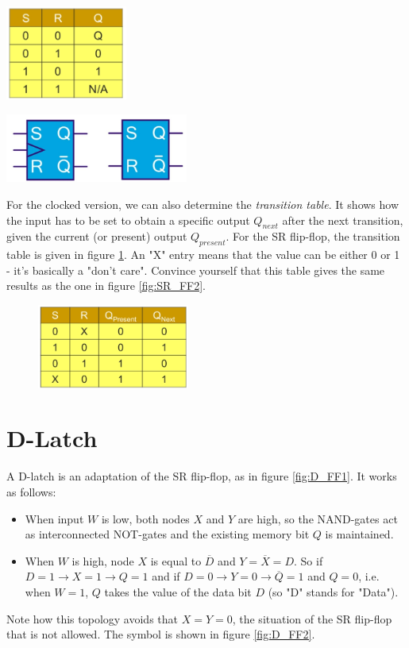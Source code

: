 \begin{minipage}{.5\textwidth}
	\centering
	\includegraphics[width=4cm]{figures/ch17/SR_FF2.jpg}
	\label{fig:SR_FF2}
\end{minipage}%
\begin{minipage}{.5\textwidth}
	\centering
	\includegraphics[width=6cm]{figures/ch17/SR_FF3.jpg}
	\label{fig:SR_FF3}
\end{minipage}
For the clocked version, we can also determine the \emph{transition table}. It shows how the input has to be set to obtain a specific output $Q_{next}$ after the next transition, given the current (or present) output $Q_{present}$. For the SR flip-flop, the transition table is given in figure \ref{fig:SR_FF4}. An "X" entry means that the value can be either 0 or 1 - it's basically a "don't care". Convince yourself that this table gives the same results as the one in figure \ref{fig:SR_FF2}.

\begin{figure}[h!]
	\centering
	\includegraphics[width=5cm]{figures/ch17/SR_FF4.jpg}
	\caption{}
	\label{fig:SR_FF4}
\end{figure}

\section{D-Latch}
\label{sec:dlatch}

A D-latch is an adaptation of the SR flip-flop, as in figure \ref{fig:D_FF1}. It works as follows:
\begin{itemize}
	\item When input $W$ is low, both nodes $X$ and $Y$ are high, so the NAND-gates act as interconnected NOT-gates and the existing memory bit $Q$ is maintained.
	\item When $W$ is high, node $X$ is equal to $\overline{D}$ and $Y = \overline{X} = D$. So if $D = 1 \rightarrow X = 1 \rightarrow Q = 1$ and if $D = 0 \rightarrow Y =  0 \rightarrow \overline{Q} = 1$ and $Q = 0$, i.e. when $W = 1$, $Q$ takes the value of the data bit $D$ (so "D" stands for "Data").
\end{itemize}
 Note how this topology avoids that $X = Y = 0$, the situation of the SR flip-flop that is not allowed. The symbol is shown in figure \ref{fig:D_FF2}.

